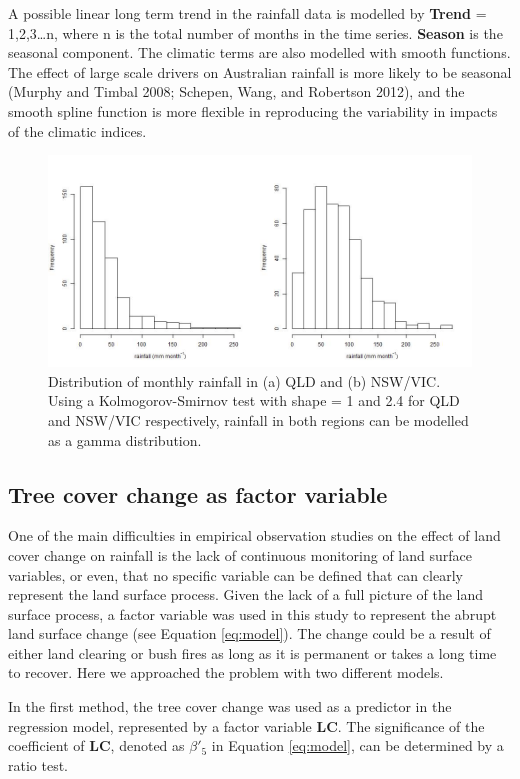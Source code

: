 \documentclass[]{elsarticle} %
\theoremstyle{definition}
\theoremstyle{definition}
\theoremstyle{definition}
\theoremstyle{remark}
\begin{document}
A possible linear long term trend in the rainfall data is modelled by
\textbf{Trend} = 1,2,3\ldots{}n, where n is the total number of months
in the time series. \textbf{Season} is the seasonal component. The
climatic terms are also modelled with smooth functions. The effect of
large scale drivers on Australian rainfall is more likely to be seasonal
(Murphy and Timbal 2008; Schepen, Wang, and Robertson 2012), and the
smooth spline function is more flexible in reproducing the variability
in impacts of the climatic indices.

\begin{figure}
\includegraphics[width=0.9\linewidth]{figures/hist_rainfall} \caption{Distribution of monthly rainfall in (a) QLD and (b) NSW/VIC. Using a Kolmogorov-Smirnov test with shape = 1 and 2.4  for QLD and NSW/VIC respectively, rainfall in both regions can be modelled as a gamma distribution.}\label{fig:hist-rain}
\end{figure}

\subsection{Tree cover change as factor variable}

One of the main difficulties in empirical observation studies on the
effect of land cover change on rainfall is the lack of continuous
monitoring of land surface variables, or even, that no specific variable
can be defined that can clearly represent the land surface process.
Given the lack of a full picture of the land surface process, a factor
variable was used in this study to represent the abrupt land surface
change (see Equation \eqref{eq:model}). The change could be a result of
either land clearing or bush fires as long as it is permanent or takes a
long time to recover. Here we approached the problem with two different
models.

In the first method, the tree cover change was used as a predictor in
the regression model, represented by a factor variable \textbf{LC}. The
significance of the coefficient of \textbf{LC}, denoted as \(\beta'_5\)
in Equation \eqref{eq:model}, can be determined by a ratio test.
\end{document}
